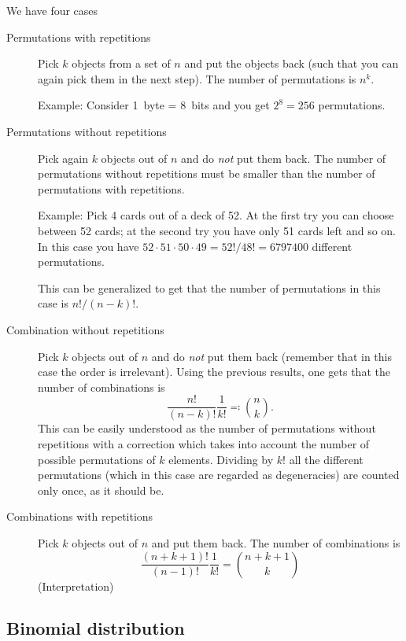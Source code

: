 \documentclass[
	10pt,
	draft
]{scrreprt}
\begin{document}
We have four cases
\begin{description}
	\item[Permutations with repetitions]
Pick $k$ objects from a set of $n$ and put the objects back (such that you can again pick them in the next step).
The number of permutations is $n^k$.

Example: Consider \SI{1}{byte} = \SI{8}{bits} and you get $2^8 = 256$ permutations.

	\item[Permutations without repetitions]


Pick again $k$ objects out of $n$ and do \emph{not} put them back.
The number of permutations without repetitions must be smaller than the number of permutations with repetitions.

Example: Pick \num{4} cards out of a deck of \num{52}.
At the first try you can choose between \num{52} cards; at the second try you have only \num{51} cards left and so on.
In this case you have $52\cdot51\cdot50\cdot49 = 52!/48! = \num{6797400}$ different permutations.

This can be generalized to get that the number of permutations in this case is $n!/(n-k)!$.

	\item[Combination without repetitions]

Pick $k$ objects out of $n$ and do \emph{not} put them back (remember that in this case the order is irrelevant).
Using the previous results, one gets that the number of combinations is
\begin{equation}
\frac{n!}{(n-k)!}\frac{1}{k!} \eqqcolon {n \choose k }.
\end{equation}
This can be easily understood as the number of permutations without repetitions with a correction which takes into account the number of possible permutations of $k$ elements.
Dividing by $k!$ all the different permutations (which in this case are regarded as degeneracies) are counted only once, as it should be.

	\item[Combinations with repetitions]

Pick $k$ objects out of $n$ and put them back.
The number of combinations is
\begin{equation}
\frac{(n+k+1)!}{(n-1)!}\frac{1}{k!} ={ n + k + 1 \choose k}
\end{equation}
(Interpretation)
\end{description}

	\subsection{Binomial distribution}
\end{document}
